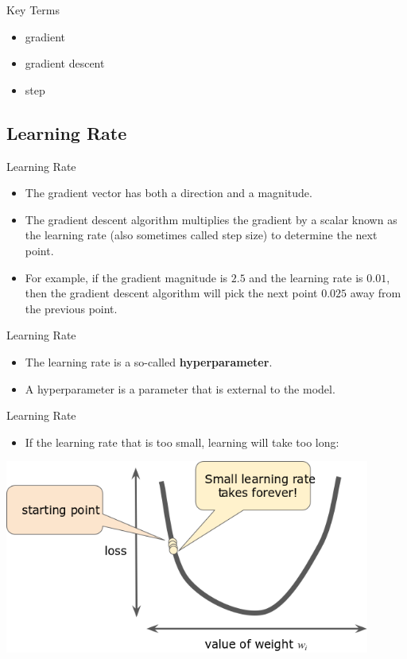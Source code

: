 \documentclass{beamer}
\begin{document}

\begin{frame}{Key Terms}
\begin{itemize}
    \item gradient
    \item gradient descent
    \item step
\end{itemize}
\end{frame}


\subsection{Learning Rate}

\begin{frame}{Learning Rate}
\begin{itemize}
\item The gradient vector has both a direction and a magnitude. 

\medskip
\item The gradient descent algorithm multiplies the gradient by a scalar known as the learning rate (also sometimes called step size) to determine the next point. 

\medskip
\item For example, if the gradient magnitude is $2.5$ and the learning rate is $0.01$, then the gradient descent algorithm will pick the next point $0.025$ away from the previous point.
\end{itemize}
\end{frame}


\begin{frame}{Learning Rate}
\begin{itemize}
\item The learning rate is a so-called {\bf hyperparameter}. 

\medskip
\item A hyperparameter is a parameter that is external to the model.
\end{itemize}
\end{frame}


\begin{frame}{Learning Rate}
\begin{itemize}
\item If the learning rate that is too small, learning will take too long:
\end{itemize}
\includegraphics[width=0.9\textwidth]{images/LearningRateTooSmall.png}
\end{frame}
\end{document}

